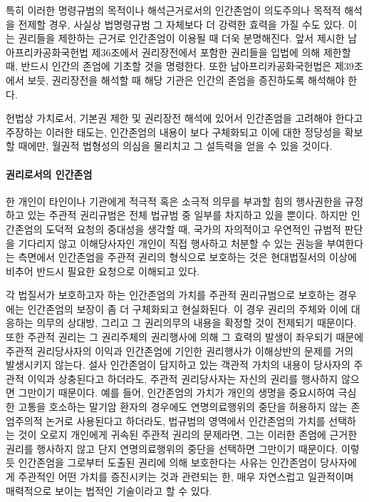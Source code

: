 특히 이러한 명령규범의 목적이나 해석근거로서의 인간존엄이 의도주의나 목적적 해석을 전제할 경우, 사실상 법명령규범 그 자체보다 더 강력한 효력을 가질 수도 있다. 이는 권리들을 제한하는 근거로 인간존엄이 이용될 때 더욱 분명해진다. 앞서 제시한 남아프리카공화국헌법 제36조에서 권리장전에서 포함한 권리들을 입법에 의해 제한할 때, 반드시 인간의 존엄에 기초할 것을 명령한다. 또한 남아프리카공화국헌법은 제39조에서 보듯, 권리장전을 해석할 때 해당 기관은 인간의 존엄을 증진하도록 해석해야 한다.

헌법상 가치로서, 기본권 제한 및 권리장전 해석에 있어서 인간존엄을 고려해야 한다고 주장하는 이러한 태도는, 인간존엄의 내용이 보다 구체화되고 이에 대한 정당성을 확보할 때에만, 월권적 법형성의 의심을 물리치고 그 설득력을 얻을 수 있을 것이다.

\paragraph{권리로서의 인간존엄}

한 개인이 타인이나 기관에게 적극적 혹은 소극적 의무를 부과할 힘의 행사권한을 규정하고 있는 주관적 권리규범은 전체 법규범 중 일부를 차지하고 있을 뿐이다. 하지만 인간존엄의 도덕적 요청의 중대성을 생각할 때, 국가의 자의적이고 우연적인 규범적 판단을 기다리지 않고 이해당사자인 개인이 직접 행사하고 처분할 수 있는 권능을 부여한다는 측면에서 인간존엄을 주관적 권리의 형식으로 보호하는 것은 현대법질서의 이상에 비추어 반드시 필요한 요청으로 이해되고 있다.

각 법질서가 보호하고자 하는 인간존엄의 가치를 주관적 권리규범으로 보호하는 경우에는 인간존엄의 보장이 좀 더 구체화되고 현실화된다. 이 경우 권리의 주체와 이에 대응하는 의무의 상대방, 그리고 그 권리의무의 내용을 확정할 것이 전제되기 때문이다. 또한 주관적 권리는 그 권리주체의 권리행사에 의해 그 효력의 발생이 좌우되기 때문에 주관적 권리당사자의 이익과 인간존엄에 기인한 권리행사가 이해상반의 문제를 거의 발생시키지 않는다. 설사 인간존엄이 담지하고 있는 객관적 가치의 내용이 당사자의 주관적 이익과 상충된다고 하더라도, 주관적 권리당사자는 자신의 권리를 행사하지 않으면 그만이기 때문이다. 예를 들어, 인간존엄의 가치가 개인의 생명을 중요시하여 극심한 고통을 호소하는 말기암 환자의 경우에도 연명의료행위의 중단을 허용하지 않는 존엄주의적 논거로 사용된다고 하더라도, 법규범의 영역에서 인간존엄의 가치를 선택하는 것이 오로지 개인에게 귀속된 주관적 권리의 문제라면, 그는 이러한 존엄에 근거한 권리를 행사하지 않고 단지 연명의료행위의 중단을 선택하면 그만이기 때문이다. 이렇듯 인간존엄을 그로부터 도출된 권리에 의해 보호한다는 사유는 인간존엄이 당사자에게 주관적인 어떤 가치를 증진시키는 것과 관련되는 한, 매우 자연스럽고 일관적이며 매력적으로 보이는 법적인 기술이라고 할 수 있다.

